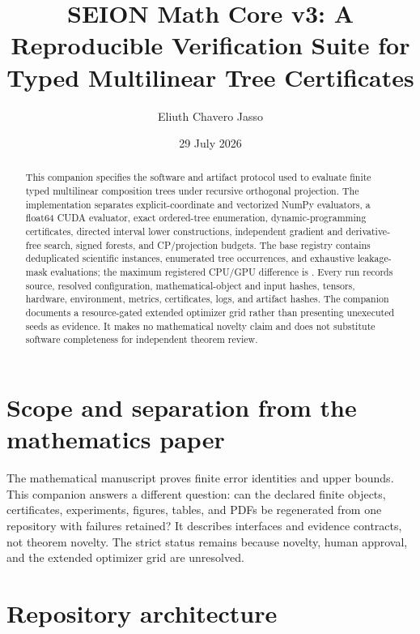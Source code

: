 \documentclass[11pt]{amsart}
\title[Typed tree verification software]{SEION Math Core v3: A Reproducible Verification Suite for Typed Multilinear Tree Certificates}
\author{Eliuth Chavero Jasso}
\date{29 July 2026}
\begin{document}
\begin{abstract}
This companion specifies the software and artifact protocol used to evaluate finite typed multilinear composition trees under recursive orthogonal projection.  The implementation separates explicit-coordinate and vectorized NumPy evaluators, a float64 CUDA evaluator, exact ordered-tree enumeration, dynamic-programming certificates, directed interval lower constructions, independent gradient and derivative-free search, signed forests, and CP/projection budgets.  The base registry contains \VThreeScientificInstances{} deduplicated scientific instances, \VThreeTreeOccurrences{} enumerated tree occurrences, and \VThreeLeakageMasks{} exhaustive leakage-mask evaluations; the maximum registered CPU/GPU difference is \VThreeMaxParity{}.  Every run records source, resolved configuration, mathematical-object and input hashes, tensors, hardware, environment, metrics, certificates, logs, and artifact hashes.  The companion documents a resource-gated extended optimizer grid rather than presenting unexecuted seeds as evidence.  It makes no mathematical novelty claim and does not substitute software completeness for independent theorem review.
\end{abstract}

\maketitle

\section{Scope and separation from the mathematics paper}

The mathematical manuscript proves finite error identities and upper bounds.
This companion answers a different question: can the declared finite objects,
certificates, experiments, figures, tables, and PDFs be regenerated from one
repository with failures retained?  It describes interfaces and evidence
contracts, not theorem novelty.  The strict status remains
\VThreeReleaseStatus{} because novelty, human approval, and the extended
optimizer grid are unresolved.

\section{Repository architecture}
\end{document}
